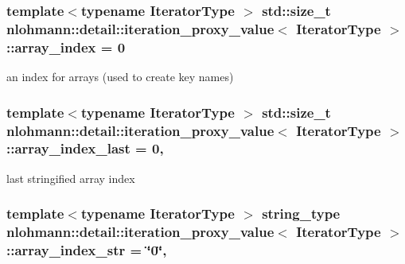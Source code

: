 \subsubsection[{\texorpdfstring{array\+\_\+index}{array_index}}]{\setlength{\rightskip}{0pt plus 5cm}template$<$typename Iterator\+Type $>$ std\+::size\+\_\+t {\bf nlohmann\+::detail\+::iteration\+\_\+proxy\+\_\+value}$<$ Iterator\+Type $>$\+::array\+\_\+index = 0\hspace{0.3cm}{\ttfamily [private]}}\hypertarget{classnlohmann_1_1detail_1_1iteration__proxy__value_ad3d18c83aff5e9f4bdbf99385b29a39a}{}\label{classnlohmann_1_1detail_1_1iteration__proxy__value_ad3d18c83aff5e9f4bdbf99385b29a39a}


an index for arrays (used to create key names) 

\subsubsection[{\texorpdfstring{array\+\_\+index\+\_\+last}{array_index_last}}]{\setlength{\rightskip}{0pt plus 5cm}template$<$typename Iterator\+Type $>$ std\+::size\+\_\+t {\bf nlohmann\+::detail\+::iteration\+\_\+proxy\+\_\+value}$<$ Iterator\+Type $>$\+::array\+\_\+index\+\_\+last = 0\hspace{0.3cm}{\ttfamily [mutable]}, {\ttfamily [private]}}\hypertarget{classnlohmann_1_1detail_1_1iteration__proxy__value_aac6e7cc0c17242a0a42c14d1e714747c}{}\label{classnlohmann_1_1detail_1_1iteration__proxy__value_aac6e7cc0c17242a0a42c14d1e714747c}


last stringified array index 

\subsubsection[{\texorpdfstring{array\+\_\+index\+\_\+str}{array_index_str}}]{\setlength{\rightskip}{0pt plus 5cm}template$<$typename Iterator\+Type $>$ {\bf string\+\_\+type} {\bf nlohmann\+::detail\+::iteration\+\_\+proxy\+\_\+value}$<$ Iterator\+Type $>$\+::array\+\_\+index\+\_\+str = \char`\"{}0\char`\"{}\hspace{0.3cm}{\ttfamily [mutable]}, {\ttfamily [private]}}\hypertarget{classnlohmann_1_1detail_1_1iteration__proxy__value_ab0b34133f45a3610070492d32978f2ea}{}\label{classnlohmann_1_1detail_1_1iteration__proxy__value_ab0b34133f45a3610070492d32978f2ea}


